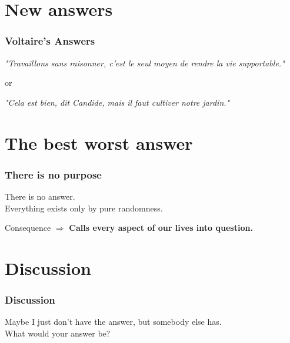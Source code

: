 \documentclass{beamer}
\begin{document}
    \section{New answers} %
    \begin{frame}
    	\frametitle{Voltaire's Answers}
    		
    	\textit{"Travaillons sans raisonner, c'est le seul moyen de rendre la vie supportable."} \pause
    	\begin{center}
    		or \pause
    	\end{center}
    	\textit{"Cela est bien, dit Candide, mais il faut cultiver notre jardin."}
    		
    \end{frame}
    
    \section{The best worst answer}
    
    \begin{frame}
    	\frametitle{There is no purpose}
    	There is no answer. \\ \pause
    	Everything exists only by pure randomness. \\ \pause
    	\begin{alertblock}{Consequence}
    		$\Rightarrow$ \textbf{Calls every aspect of our lives into question.}
		\end{alertblock}
    \end{frame}
    
    
    \section{Discussion}
    
    \begin{frame}
    	\frametitle{Discussion}
    	
    	\begin{center}
    	Maybe I just don't have the answer, but somebody else has. \\
    	What would your answer be?
    	\end{center}
    	
    \end{frame}
    
\end{document}
